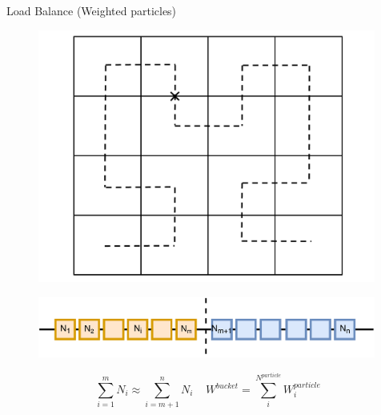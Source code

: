 \documentclass{beamer}
\begin{document}
\begin{frame}{Load Balance (Weighted particles)}
\begin{minipage}{0.3 \textwidth}
\begin{figure}
\includegraphics[width=0.99\textwidth]{./PPT/SFC_bucket_decomposition}
\end{figure}
\end{minipage}
\begin{minipage}{0.69 \textwidth}
\begin{figure}
\includegraphics[width=0.99\textwidth]{./PPT/Domain-Decomposition}
\end{figure}
$$
\sum_{i=1}^{m} N_i \approx \sum_{i=m+1}^{n} N_i 
~~~~~
W^{bucket} = \sum_i^{N^{particle}} W_i^{particle}
$$
\end{minipage}


\end{frame}
\end{document}

